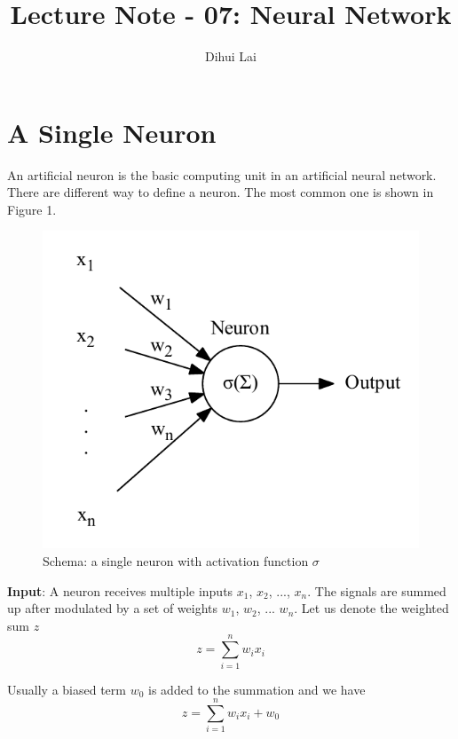 \documentclass[12pt, oneside]{article}
\title{Lecture Note - 07: Neural Network}
\author{Dihui Lai}
\begin{document}
\maketitle
\tableofcontents

\vspace{.25in}

\section{A Single Neuron}

An artificial neuron is the basic computing unit in an artificial neural network. There are different way to define a neuron. The most common one is shown in Figure 1.
\begin{figure}
\center
\includegraphics[scale=0.6,page=1]{Figures/singleneuron.pdf}
\caption{Schema: a single neuron with activation function $\sigma$}
\end{figure}

\textbf{Input}: A neuron receives multiple inputs $x_1$, $x_2$, ..., $x_n$. The signals are summed up after modulated by a set of weights $w_1$, $w_2$, ... $w_n$. Let us denote the weighted sum $z$
\begin{equation}
z=\sum\limits_{i=1}^{n}w_i x_i
\end{equation}

Usually a biased term $w_0$ is added to the summation and we have 
\begin{equation}
z=\sum\limits_{i=1}^{n}w_i x_i+w_0
\end{equation}
\end{document}
